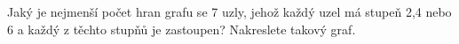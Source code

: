 Jaký je nejmenší počet hran grafu se 7 uzly, jehož každý uzel má stupeň 2,4 nebo
6 a každý z těchto stupňů je zastoupen? Nakreslete takový graf.
